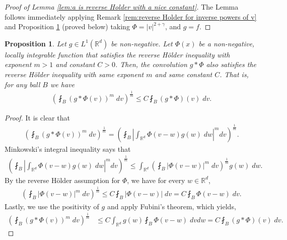\documentclass[12pt,american]{amsart}
\numberwithin{equation}{section}
\theoremstyle{plain}
\newtheorem{prop}[thm]{Proposition}
\theoremstyle{definition}                  %
\begin{document}
  \begin{proof}[Proof of Lemma \ref{lem:a is reverse Holder with a nice constant}] 
    The Lemma follows immediately applying Remark \ref{rem:reverse Holder for inverse powers of v} and Proposition  \ref{prop:reverse Holder is a convex condition} (proved below) taking $\Phi=|v|^{2+\gamma}$,  and $g = f$.
  \end{proof}

  \begin{prop}\label{prop:reverse Holder is a convex condition}
   Let $g\in L^1(\mathbb{R}^d)$ be non-negative.  Let $\Phi(x)$ be a non-negative, locally integrable function that satisfies the reverse H\"older inequality with exponent $m>1$ and constant $C>0$. Then, the convolution $g* \Phi$ also satisfies the reverse H\"older inequality with same exponent $m$ and same constant $C$. That is, for any ball $B$ we have
    \begin{align*}
      \left (\fint_{B} (g * \Phi (v))^m \;dv \right )^{\frac{1}{m}} \leq C \fint_{B} (g *\Phi)(v)\;dv.
    \end{align*}	
  \end{prop}

  \begin{proof}
    It is clear that	  
    \begin{align*}
     \left (\fint_{B} (g * \Phi (v))^m \;dv \right )^{\frac{1}{m}} =\left ( \fint_B \left | \int_{\mathbb{R}^d} \Phi(v-w) g(w)\;dw \right |^mdv \right )^{\frac{1}{m}}.
    \end{align*}			
    Minkowski's integral inequality says that
    \begin{align*}
     \left ( \fint_B \left | \int_{\mathbb{R}^d} \Phi(v-w) g(w)\;dw \right |^mdv \right )^{\frac{1}{m}} \leq \int_{\mathbb{R}^d} \left (\fint_B  |\Phi(v-w)|^m\;dv \right )^{\frac{1}{m}}g(w)\;dw. 	 		
    \end{align*}			
    By the reverse H\"older assumption for $\Phi$, we have for every $w\in \mathbb{R}^d$,
    \begin{align*}
     \left (\fint_B  |\Phi(v-w)|^m\;dv \right )^{\frac{1}{m}} \leq C\fint_{B}|\Phi(v-w)|\;dv = C\fint_{B}\Phi(v-w)\;dv.
    \end{align*}			
    Lastly, we use the positivity of $g$ and apply Fubini's theorem, which yields,
    \begin{align*}
     \left (\fint_{B} (g * \Phi (v))^m \;dv \right )^{\frac{1}{m}} & \leq C\int_{\mathbb{R}^d} g(w)\fint_{B}\Phi(v-w)\;dvdw = C\fint_B (g* \Phi)(v)\;dv.	 	 	 		
    \end{align*}
  \end{proof}
\end{document}
